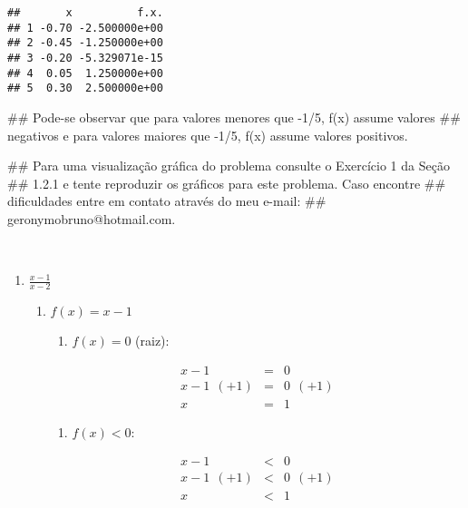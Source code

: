 \documentclass[]{book}
\newenvironment{Shaded}{\begin{snugshade}}{\end{snugshade}}
\newcommand{\NormalTok}[1]{#1}
\providecommand{\tightlist}{%
  \setlength{\itemsep}{0pt}\setlength{\parskip}{0pt}}
\begin{document}
\begin{enumerate}
\begin{verbatim}
##       x          f.x.
## 1 -0.70 -2.500000e+00
## 2 -0.45 -1.250000e+00
## 3 -0.20 -5.329071e-15
## 4  0.05  1.250000e+00
## 5  0.30  2.500000e+00
\end{verbatim}

\begin{Shaded}
\begin{Highlighting}[]
\NormalTok{##  Pode-se observar que para valores menores que -1/5, f(x) assume valores}
\NormalTok{## negativos e para valores maiores que -1/5, f(x) assume valores positivos.}

\NormalTok{##  Para uma visualização gráfica do problema consulte o Exercício 1 da Seção}
\NormalTok{## 1.2.1 e tente reproduzir os gráficos para este problema. Caso encontre}
\NormalTok{## dificuldades entre em contato através do meu e-mail:}
\NormalTok{## geronymobruno@hotmail.com.}
\end{Highlighting}
\end{Shaded}

  ~

  \begin{enumerate}
  \def\labelenumii{\alph{enumii})}
  \setcounter{enumii}{4}
  \item
    \(\frac{x-1}{x-2}\)

    \begin{enumerate}
    \def\labelenumiii{\roman{enumiii})}
    \item
      \(f(x) = x-1\)

      \begin{enumerate}
      \def\labelenumiv{\Roman{enumiv})}
      \tightlist
      \item
        \(f(x) = 0\) (raiz):
      \end{enumerate}

      \begin{eqnarray}
      x-1 &=& 0 \nonumber \\
      x-1 \ \ (+1) &=& 0 \ \ (+1) \nonumber \\
      x &=& 1 \nonumber
      \end{eqnarray}

      \begin{enumerate}
      \def\labelenumiv{\Roman{enumiv})}
      \setcounter{enumiv}{1}
      \tightlist
      \item
        \(f(x) < 0\):
      \end{enumerate}

      \begin{eqnarray}
      x-1 &<& 0 \nonumber \\
      x-1 \ \ (+1) &<& 0 \ \ (+1) \nonumber \\
      x &<& 1 \nonumber
      \end{eqnarray}


\end{enumerate}
\end{enumerate}
\end{enumerate}
\end{document}
